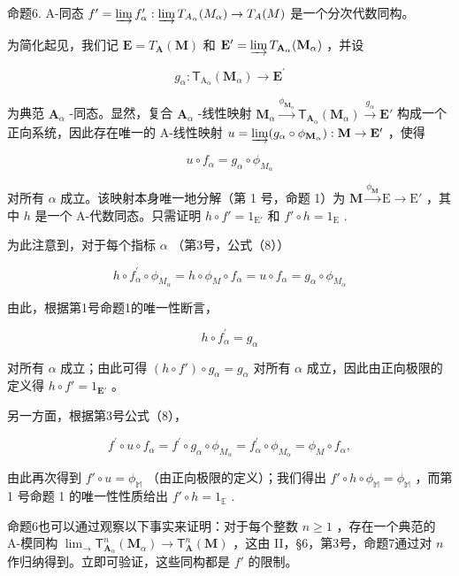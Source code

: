 命题6. A-同态 \(f' = \varinjlim f_{\alpha}' : \varinjlim T_{A_{\alpha}}(M_{\alpha}) \to T_{A}(M)\) 是一个分次代数同构。

为简化起见，我们记 \(\mathbf{E} = T_{\mathbf{A}}(\mathbf{M})\) 和 \(\mathbf{E}' = \varinjlim T_{\mathbf{A}_{\alpha}}(\mathbf{M}_{\alpha})\) ，并设

\[
g _ {\alpha}: \mathsf {T} _ {\mathrm{A} _ {\alpha}} (\mathbf {M} _ {\alpha}) \rightarrow \mathbf {E} ^ {\prime}
\]

为典范 \(\mathbf{A}_{\alpha}\) -同态。显然，复合 \(\mathbf{A}_{\alpha}\) -线性映射 \(\mathbf{M}_{\alpha} \xrightarrow{\phi_{\mathbf{M}_{\alpha}}} \mathsf{T}_{\mathbf{A}_{\alpha}}(\mathbf{M}_{\alpha}) \xrightarrow{g_{\alpha}} \mathbf{E}'\) 构成一个正向系统，因此存在唯一的 A-线性映射 \(u = \varinjlim (g_{\alpha} \circ \phi_{\mathbf{M}_{\alpha}}): \mathbf{M} \to \mathbf{E}'\) ，使得

\[
u \circ f _ {\alpha} = g _ {\alpha} \circ \phi_ {M _ {\alpha}}
\]

对所有 \(\alpha\) 成立。该映射本身唯一地分解（第 1 号，命题 1）为 \(\mathbf{M} \xrightarrow{\phi_{\mathbf{M}}} \mathrm{E} \to \mathrm{E}'\) ，其中 \(h\) 是一个 A-代数同态。只需证明 \(h \circ f' = 1_{\mathrm{E}'}\) 和 \(f' \circ h = 1_{\mathrm{E}}\) .

为此注意到，对于每个指标 \(\alpha\) （第3号，公式（8））

\[
h \circ f _ {\alpha} ^ {\prime} \circ \phi_ {M _ {\alpha}} = h \circ \phi_ {M} \circ f _ {\alpha} = u \circ f _ {\alpha} = g _ {\alpha} \circ \phi_ {M _ {\alpha}}
\]

由此，根据第1号命题1的唯一性断言，

\[
h \circ f _ {\alpha} ^ {\prime} = g _ {\alpha}
\]

对所有 \(\alpha\) 成立；由此可得 \((h \circ f') \circ g_{\alpha} = g_{\alpha}\) 对所有 \(\alpha\) 成立，因此由正向极限的定义得 \(h \circ f' = 1_{\mathbf{E}'}\) 。

另一方面，根据第3号公式（8），

\[
f ^ {\prime} \circ u \circ f _ {\alpha} = f ^ {\prime} \circ g _ {\alpha} \circ \phi_ {M _ {\alpha}} = f _ {\alpha} ^ {\prime} \circ \phi_ {M _ {\alpha}} = \phi_ {M} \circ f _ {\alpha},
\]

由此再次得到 \(f' \circ u = \phi_{\mathbb{M}}\) （由正向极限的定义）；我们得出 \(f' \circ h \circ \phi_{\mathbb{M}} = \phi_{\mathbb{M}}\) ，而第 1 号命题 1 的唯一性性质给出 \(f' \circ h = 1_{\mathbb{E}}\) .

命题6也可以通过观察以下事实来证明：对于每个整数 \(n \geqslant 1\) ，存在一个典范的 A-模同构 \(\lim_{\longrightarrow} \mathsf{T}_{\mathbf{A}_{\alpha}}^{n}(\mathbf{M}_{\alpha}) \to \mathsf{T}_{\mathbf{A}}^{n}(\mathbf{M})\) ，这由 II，§6，第3号，命题7通过对 \(n\) 作归纳得到。立即可验证，这些同构都是 \(f'\) 的限制。

